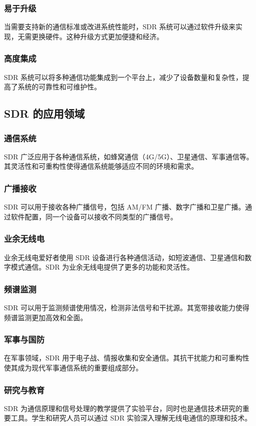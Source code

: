 ﻿\documentclass[UTF8]{ctexbook}
\begin{document}
\subsubsection{易于升级}
当需要支持新的通信标准或改进系统性能时，SDR 系统可以通过软件升级来实现，无需更换硬件。这种升级方式更加便捷和经济。

\subsubsection{高度集成}
SDR 系统可以将多种通信功能集成到一个平台上，减少了设备数量和复杂性，提高了系统的可靠性和可维护性。

\subsection{SDR 的应用领域}
\subsubsection{通信系统}
SDR 广泛应用于各种通信系统，如蜂窝通信（4G/5G）、卫星通信、军事通信等。其灵活性和可重构性使得通信系统能够适应不同的环境和需求。

\subsubsection{广播接收}
SDR 可以用于接收各种广播信号，包括 AM/FM 广播、数字广播和卫星广播。通过软件配置，同一个设备可以接收不同类型的广播信号。

\subsubsection{业余无线电}
业余无线电爱好者使用 SDR 设备进行各种通信活动，如短波通信、卫星通信和数字模式通信。SDR 为业余无线电提供了更多的功能和灵活性。

\subsubsection{频谱监测}
SDR 可以用于监测频谱使用情况，检测非法信号和干扰源。其宽带接收能力使得频谱监测更加高效和全面。

\subsubsection{军事与国防}
在军事领域，SDR 用于电子战、情报收集和安全通信。其抗干扰能力和可重构性使其成为现代军事通信系统的重要组成部分。

\subsubsection{研究与教育}
SDR 为通信原理和信号处理的教学提供了实验平台，同时也是通信技术研究的重要工具。学生和研究人员可以通过 SDR 实验深入理解无线电通信的原理和技术。
\end{document}
